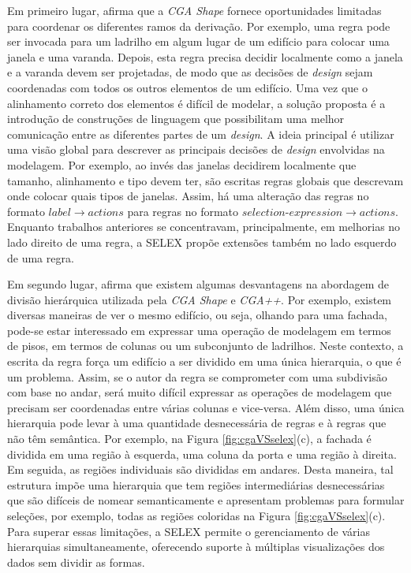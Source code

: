 Em primeiro lugar,  afirma que a \textit{CGA Shape} fornece oportunidades limitadas para coordenar os diferentes ramos da derivação. Por exemplo, uma regra pode ser invocada para um ladrilho em algum lugar de um edifício para colocar uma janela e uma varanda. Depois, esta regra precisa decidir localmente como a janela e a varanda devem ser projetadas, de modo que as decisões de \textit{design} sejam coordenadas com todos os outros elementos de um edifício. Uma vez que o alinhamento correto dos elementos é difícil de modelar, a solução proposta é a introdução de construções de linguagem que possibilitam uma melhor comunicação entre as diferentes partes de um \textit{design}. A ideia principal é utilizar uma visão global para descrever as principais decisões de \textit{design} envolvidas na modelagem. Por exemplo, ao invés das janelas decidirem localmente que tamanho, alinhamento e tipo devem ter, são escritas regras globais que descrevam onde colocar quais tipos de janelas. Assim, há uma alteração das regras no formato $label \rightarrow actions$ para regras no formato $selection\mbox{-}expression \rightarrow actions$. Enquanto trabalhos anteriores se concentravam, principalmente, em melhorias no lado direito de uma regra, a \gls{SELEX} propõe extensões também no lado esquerdo de uma regra.

Em segundo lugar,  afirma que existem algumas desvantagens na abordagem de divisão hierárquica utilizada pela \textit{CGA Shape} e \textit{CGA++}. Por exemplo, existem diversas maneiras de ver o mesmo edifício, ou seja, olhando para uma fachada, pode-se estar interessado em expressar uma operação de modelagem em termos de pisos, em termos de colunas ou um subconjunto de ladrilhos. Neste contexto, a escrita da regra força um edifício a ser dividido em uma única hierarquia, o que é um problema. Assim, se o autor da regra se comprometer com uma subdivisão com base no andar, será muito difícil expressar as operações de modelagem que precisam ser coordenadas entre várias colunas e vice-versa. Além disso, uma única hierarquia pode levar à uma quantidade desnecessária de regras e à regras que não têm semântica. Por exemplo, na Figura \ref{fig:cgaVSselex}(c), a fachada é dividida em uma região à esquerda, uma coluna da porta e uma região à direita. Em seguida, as regiões individuais são divididas em andares. Desta maneira, tal estrutura impõe uma hierarquia que tem regiões intermediárias desnecessárias que são difíceis de nomear semanticamente e apresentam problemas para formular seleções, por exemplo, todas as regiões coloridas na Figura \ref{fig:cgaVSselex}(c). Para superar essas limitações, a \gls{SELEX} permite o gerenciamento de várias hierarquias simultaneamente, oferecendo suporte à múltiplas visualizações dos dados sem dividir as formas.

